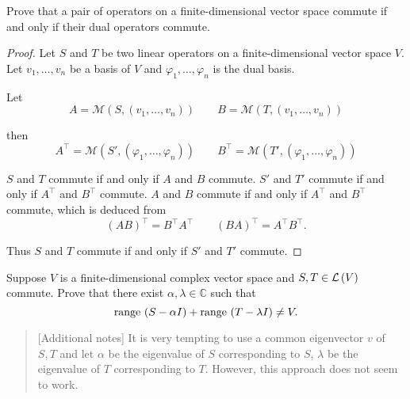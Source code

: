 \begin{exercise}
    Prove that a pair of operators on a finite-dimensional vector space commute if and only if their dual operators commute.
\end{exercise}

\begin{proof}
    Let $S$ and $T$ be two linear operators on a finite-dimensional vector space $V$. Let $v_{1}, \ldots, v_{n}$ be a basis of $V$ and $\varphi_{1}, \ldots, \varphi_{n}$ is the dual basis.

    Let
    \[
        A = \mathcal{M}(S, (v_{1}, \ldots, v_{n}))\qquad
        B = \mathcal{M}(T, (v_{1}, \ldots, v_{n}))
    \]

    then
    \[
        A^{\top} = \mathcal{M}(S', (\varphi_{1}, \ldots, \varphi_{n}))\qquad
        B^{\top} = \mathcal{M}(T', (\varphi_{1}, \ldots, \varphi_{n}))
    \]

    $S$ and $T$ commute if and only if $A$ and $B$ commute. $S'$ and $T'$ commute if and only if $A^{\top}$ and $B^{\top}$ commute. $A$ and $B$ commute if and only if $A^{\top}$ and $B^{\top}$ commute, which is deduced from
    \[
        {(AB)}^{\top} = B^{\top}A^{\top}\qquad {(BA)}^{\top} = A^{\top}B^{\top}.
    \]

    Thus $S$ and $T$ commute if and only if $S'$ and $T'$ commute.
\end{proof}
\newpage

\begin{exercise}
    Suppose $V$ is a finite-dimensional complex vector space and $S, T\in\mathcal{L}\left({V}\right)$ commute. Prove that there exist $\alpha, \lambda\in\mathbb{C}$ such that
    \[
        \operatorname{range}\,{(S - \alpha I)} + \operatorname{range}\,{(T - \lambda I)} \ne V.
    \]
\end{exercise}

\begin{quote}[Additional notes]
    It is very tempting to use a common eigenvector $v$ of $S, T$ and let $\alpha$ be the eigenvalue of $S$ corresponding to $S$, $\lambda$ be the eigenvalue of $T$ corresponding to $T$. However, this approach does not seem to work.
\end{quote}

